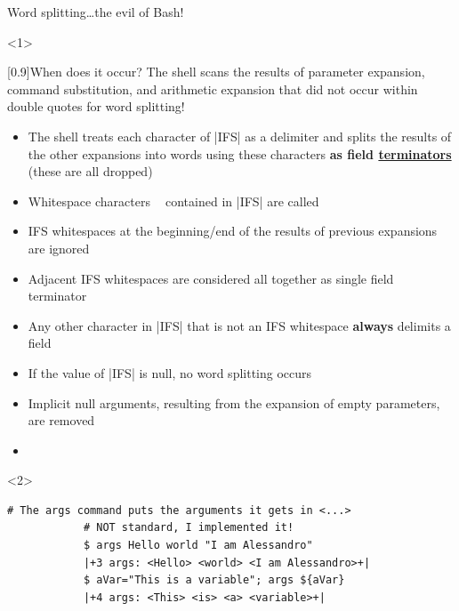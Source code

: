 \begin{frame}[fragile]{Word splitting}{\ldots{}the evil of Bash!}
    \vspace{-2mm}
    \begin{onlyenv}<1>
        \begin{varblock}{}[0.9\textwidth]{When does it occur?}
            The shell scans the results of parameter expansion, command substitution, and arithmetic expansion that did not occur within double quotes for word splitting!
        \end{varblock}
        \begin{itemize}
            \item The shell treats each character of \bash|IFS| as a delimiter and splits the results of the other expansions into words using these characters \textbf{as field \alert{\underline{terminators}}} (these are all dropped)
            \item Whitespace characters $\;$$\;$ contained in \bash|IFS| are called 
            \item \alert{IFS whitespaces at the beginning/end} of the results of previous expansions \alert{are ignored}
            \item \alert{Adjacent IFS whitespaces} are considered all together as \alert{single field terminator}
            \item \alert{Any other character} in \bash|IFS| that is not an IFS whitespace \alert{\textbf{always} delimits a field}
            \item If the value of \bash|IFS| is null, no word splitting occurs
            \item Implicit null arguments, resulting from the expansion of empty parameters, are removed
            \item {}
        \end{itemize}
    \end{onlyenv}
    \begin{onlyenv}<2>
        \begin{lstlisting}[style=MyBash, style=oddnumbers]
            # The args command puts the arguments it gets in <...>
            # NOT standard, I implemented it!
            $ args Hello world "I am Alessandro"
            |+3 args: <Hello> <world> <I am Alessandro>+|
            $ aVar="This is a variable"; args ${aVar}
            |+4 args: <This> <is> <a> <variable>+|

\end{lstlisting}
\end{onlyenv}
\end{frame}
